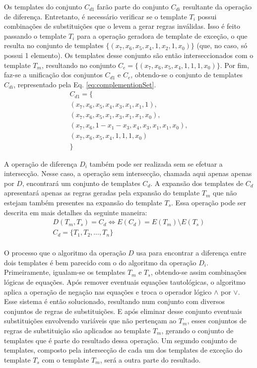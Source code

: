 Os templates do conjunto $C_{d1}$ farão parte do conjunto $C_{di}$ resultante da operação de diferença. Entretanto, é necessário verificar se o template $T_i$ possui combinações de substituições que o levem a gerar regras inválidas. Isso é feito passando o template $T_i$ para a operação geradora de template de exceção, o que resulta no conjunto de templates $\{(x_7, x_6, x_5, x_4, 1, x_2, 1, x_0)\}$ (que, no caso, só possui 1 elemento). Os templates desse conjunto são então interseccionados com o template $T_m$, resultando no conjunto $C_e = \{(x_7, x_6, x_5, x_4, 1, 1, 1, x_0)\}$. Por fim, faz-se a unificação dos conjuntos $C_{d1}$ e $C_e$, obtendo-se o conjunto de templates $C_{di}$, representado pela Eq. \ref{eq:complementionSet}.
\begin{equation}
\begin{split}
C_{d1} = \{\\(x_7, x_6, x_5, x_4, x_3, x_1, x_1, 1), \\(x_7, x_6, x_5, x_1, x_3, x_1, x_1, x_0), \\(x_7, x_6, 1 - x_1 - x_3, x_4, x_3, x_1, x_1, x_0), \\(x_7, x_6, x_5, x_4, 1, 1, 1, x_0)\\\}
\label{eq:complementionSet}
\end{split}
\end{equation}

A operação de diferença $D_i$ também pode ser realizada sem se efetuar a intersecção. Nesse caso, a operação sem intersecção, chamada aqui apenas apenas por $D$, encontrará um conjunto de templates $C_d$. A expansão dos templates de $C_{d}$ apresentará apenas as regras geradas pela expansão do template $T_m$ que não estejam também presentes na expansão do template $T_s$. Essa operação pode ser descrita em mais detalhes da seguinte maneira:
\begin{equation}
\begin{split}
D(T_m,T_s)= C_d \Leftrightarrow E(C_d) = E(T_m) \setminus E(T_s) \\
C_d = \{T_1,T_2,\dots, T_n\}\\
\end{split}
\end{equation}

O processo que o algoritmo da operação $D$ usa para encontrar a diferença entre dois templates é bem parecido com o do algoritmo da operação $D_{i}$. Primeiramente, igualam-se os templates $T_m$ e $T_s$, obtendo-se assim combinações lógicas de equações. Após remover eventuais equações tautológicas, o algoritmo aplica a operação de negação nas equações e troca o operador lógico $\wedge$ por $\vee$. Esse sistema é então solucionado, resultando num conjunto com diversos conjuntos de regras de substituições. E após eliminar desse conjunto eventuais substituições envolvendo variáveis que não pertençam ao $T_m$, esses conjuntos de regras de substituição são aplicados ao template $T_m$, gerando o conjunto de templates que é parte do resultado dessa operação. Um segundo conjunto de templates, composto pela intersecção de cada um dos templates de exceção do template $T_s$ com o template $T_m$, será a outra parte do resultado.

